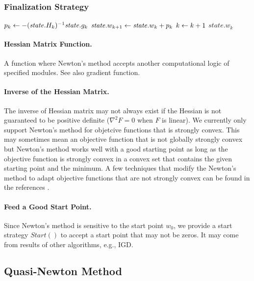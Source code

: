 \subsubsection{Finalization Strategy}
\begin{algorithm} \label{alg:finalization-newton}
\begin{algorithmic}[1]
    \State $p_k \leftarrow - (\mathit{state}.H_k)^{-1} \mathit{state}.g_k$
    \State $\mathit{state}.w_{k+1} \leftarrow \mathit{state}.w_k + p_k$
    \State $k \leftarrow k + 1$
    \State \Return $\mathit{state}.w_k$
\end{algorithmic}
\end{algorithm}

\paragraph{Hessian Matrix Function.}
A function where Newton's method accepts another computational logic of specified modules. See also gradient function.

\paragraph{Inverse of the Hessian Matrix.}
The inverse of Hessian matrix may not always exist if the Hessian is not guaranteed to be positive definite ($\nabla^2 F = 0$ when $F$ is linear).
We currently only support Newton's method for objetcive functions that is strongly convex.
This may sometimes mean an objective function that is not globally strongly convex but Newton's method works well with a good starting point as long as the objective function is strongly convex in a convex set that contains the given starting point and the minimum.
A few techniques that modify the Newton's method to adapt objective functions that are not strongly convex can be found in the references \cite{bertsekas1999nonlinear, nocedal2006numerical}.

\paragraph{Feed a Good Start Point.}
Since Newton's method is sensitive to the start point $w_0$, we provide a start strategy $\mathit{Start()}$ to accept a start point that may not be zeros.
It may come from results of other algorithms, e.g., IGD.

\subsection{Quasi-Newton Method}

